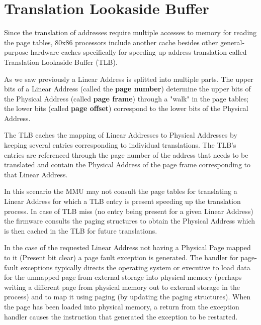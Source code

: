 \documentclass[twoside]{article}
\renewcommand{\cite}[1]{[#1]}
\begin{document}
\section{Translation Lookaside Buffer}

Since the translation of addresses require multiple accesses to memory for reading the page tables, 80x86 processors include another cache besides other general-purpose hardware caches specifically for speeding up address translation called Translation Lookaside Buffer (TLB).

As we saw previously a Linear Address is splitted into multiple parts. The upper bits of a Linear Address (called the \textbf{page number}) determine the upper bits of the Physical Address (called \textbf{page frame}) through a "walk" in the page tables; the lower bits (called \textbf{page offset}) correspond to the lower bits of the Physical Address.

The \marginnote{(\cite{intel} pp. 140)} TLB caches the mapping of Linear Addresses to Physical Addresses by keeping several entries corresponding to individual translations. The TLB's entries are referenced through the page number of the address that needs to be translated and contain the Physical Address of the page frame corresponding to that Linear Address.

In  this scenario the MMU may not consult the page tables for translating a Linear Address for which a TLB entry is present speeding up the translation process. In case of TLB miss (no entry being present for a given Linear Address) the firmware consults the paging structures to obtain the Physical Address which is then cached in the TLB for future translations.  

In \marginnote{(\cite{intel} Sec. 4.12)} the case of the requested Linear Address not having a Physical Page mapped to it (Present bit clear) a page fault exception is generated. The handler for page-fault exceptions typically directs the operating system or executive to load data for the unmapped page from external storage into physical memory (perhaps writing a different page from physical memory out to external storage in the process) and to map it using paging (by updating the paging structures). When the page has been loaded into physical memory, a return from the exception handler causes the instruction that generated the exception to be restarted. \marginnote{\textcolor{red}{(\cite{bovet_cesati_2006} pp. 142) For hardware handling to be added on Lec2 when checking privileges}}
\end{document}
